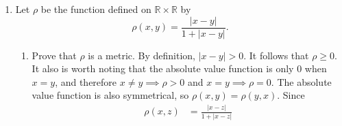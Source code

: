 \documentclass{article}
\begin{document}
\begin{enumerate}
\begin{proof}
\begin{align*}
                        \rho_1 & = \lvert x_1-x_2\rvert + \lvert y_1-y_2\rvert \\
                               & = \sqrt{(x_1-x_2)^2} + \sqrt{(y_1-y_2)^2}     \\
                               & \leq 2\sqrt{(x_1-x_2)^2+(y_1-y_2)^2}          \\
                               & = 2\rho_2(p_1, p_2)                           \\
                               & < 2\delta = \varepsilon
                  \end{align*}
                  and
                  \begin{align*}
                        \rho_1 & = \lvert x_1-x_2\rvert + \lvert y_1-y_2\rvert           \\
                               & \leq 2\max\{\lvert x_1-x_2\rvert,\lvert y_1-y_2\rvert\} \\
                               & = 2\rho_{\max}(p_1, p_2)                                \\
                               & < 2\delta = \varepsilon
                  \end{align*}
                  Thus, $\rho_1$ is equivalent to $\rho_{\max}$ and $\rho_1$ is equivalent
                  to $\rho_2$. By the transitive property, $\rho_{\max}$ is also equivalent
                  to $\rho_2$.
            \end{proof}
            \setcounter{enumi}{13}
      \item Let $\rho$ be the function defined on $\mathbb{R}\times\mathbb{R}$
            by
            \[
                  \rho(x, y) = \frac{\lvert x-y\rvert}{1+\lvert x-y\rvert}.
            \]
            \begin{enumerate}
                  \item Prove that $\rho$ is a metric.
                        \medbreak
                        By definition, $\lvert x-y\rvert > 0$. It follows that $\rho\geq0$.
                        It also is worth noting that the absolute value function is only
                        $0$ when $x=y$, and therefore $x\neq y\implies \rho>0$ and
                        $x=y\implies\rho=0$. The absolute value function is also
                        symmetrical, so $\rho(x,y)=\rho(y,x)$. Since
                        \begin{align*}
                              \rho(x,z) & = \frac{\lvert x-z\rvert}{1+\lvert x-z\rvert}                                                                               \\

\end{align*}
\end{enumerate}
\end{enumerate}
\end{document}
